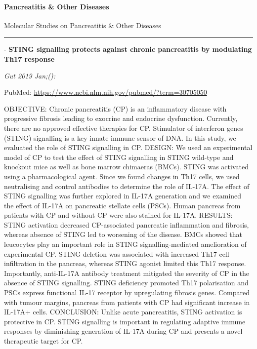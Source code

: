 \documentclass[]{article}
\let\oldparagraph\paragraph
\renewcommand{\paragraph}[1]{\oldparagraph{#1}\mbox{}}
\begin{document}
\hypertarget{pancreatitis-other-diseases}{%
\paragraph{Pancreatitis \& Other
Diseases}\label{pancreatitis-other-diseases}}

Molecular Studies on Pancreatitis \& Other Diseases

\begin{center}\rule{0.5\linewidth}{\linethickness}\end{center}

 - \textbf{STING signalling protects against chronic pancreatitis by
modulating Th17 response}

\emph{Gut 2019 Jan;():}

PubMed: \url{https://www.ncbi.nlm.nih.gov/pubmed/?term=30705050}

OBJECTIVE: Chronic pancreatitis (CP) is an inflammatory disease with
progressive fibrosis leading to exocrine and endocrine dysfunction.
Currently, there are no approved effective therapies for CP. Stimulator
of interferon genes (STING) signalling is a key innate immune sensor of
DNA. In this study, we evaluated the role of STING signalling in CP.
DESIGN: We used an experimental model of CP to test the effect of STING
signalling in STING wild-type and knockout mice as well as bone marrow
chimaeras (BMCs). STING was activated using a pharmacological agent.
Since we found changes in Th17 cells, we used neutralising and control
antibodies to determine the role of IL-17A. The effect of STING
signalling was further explored in IL-17A generation and we examined the
effect of IL-17A on pancreatic stellate cells (PSCs). Human pancreas
from patients with CP and without CP were also stained for IL-17A.
RESULTS: STING activation decreased CP-associated pancreatic
inflammation and fibrosis, whereas absence of STING led to worsening of
the disease. BMCs showed that leucocytes play an important role in STING
signalling-mediated amelioration of experimental CP. STING deletion was
associated with increased Th17 cell infiltration in the pancreas,
whereas STING agonist limited this Th17 response. Importantly,
anti-IL-17A antibody treatment mitigated the severity of CP in the
absence of STING signalling. STING deficiency promoted Th17 polarisation
and PSCs express functional IL-17 receptor by upregulating fibrosis
genes. Compared with tumour margins, pancreas from patients with CP had
significant increase in IL-17A+ cells. CONCLUSION: Unlike acute
pancreatitis, STING activation is protective in CP. STING signalling is
important in regulating adaptive immune responses by diminishing
generation of IL-17A during CP and presents a novel therapeutic target
for CP.
\end{document}
